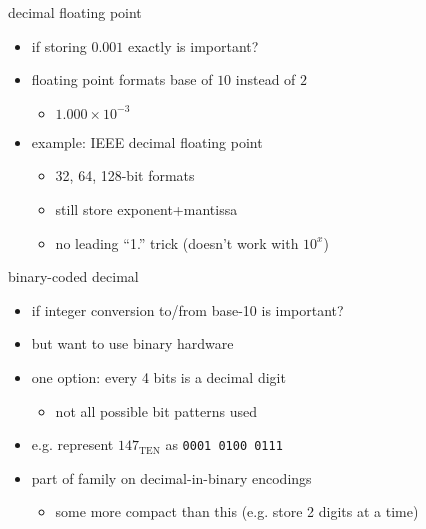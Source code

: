 \begin{frame}{decimal floating point}
    \begin{itemize}
        \item if storing $0.001$ exactly is important?
        \item floating point formats base of $10$ instead of $2$
            \begin{itemize}
            \item $1.000\times 10^{-3}$
            \end{itemize}
        \item example: IEEE decimal floating point
            \begin{itemize}
            \item 32, 64, 128-bit formats
            \item still store exponent+mantissa
            \item no leading ``1.'' trick (doesn't work with $10^x$)
        \end{itemize}
    \end{itemize}
\end{frame}

\begin{frame}{binary-coded decimal}
    \begin{itemize}
        \item if integer conversion to/from base-10 is important?
        \item but want to use binary hardware
        \item one option: every 4 bits is a decimal digit
            \begin{itemize}
            \item not all possible bit patterns used
            \end{itemize}
        \item e.g. represent $147_\text{TEN}$ as {\tt 0001 0100 0111}
            \vspace{.5cm}
        \item part of family on decimal-in-binary encodings
            \begin{itemize}
            \item some more compact than this (e.g. store 2 digits at a time)
            \end{itemize}
    \end{itemize}
\end{frame}
